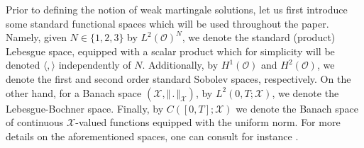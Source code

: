 \documentclass[10pt,number,preprint,times]{elsarticle}
\numberwithin{equation}{section} %
\begin{document}
Prior to defining the notion of weak martingale solutions, let us first introduce some standard functional spaces which will be used throughout the paper. Namely, given $N \in \{1,2,3\}$ by $L^2(\mathcal{O})^N$, we denote the standard (product) Lebesgue space, equipped with a scalar product which for simplicity will be denoted $\langle, \rangle$ independently of $N$. Additionally, by $H^1(\mathcal{O})$ and $H^2(\mathcal{O})$, we denote the first and second order standard Sobolev spaces, respectively. On the other hand, for a Banach space $\left(\mathscr{X},\Vert \,.\,\Vert_{\mathscr{X}}\right)$, by $L^2(0,T;\mathscr{X})$, we denote the Lebesgue-Bochner space. Finally, by $C([0,T];\mathscr{X})$ we denote the Banach space of continuous $\mathscr{X}$-valued functions equipped with the uniform  norm. For more details on the aforementioned spaces, one can consult for instance \cite{adams2003sobolev}.
\end{document}
